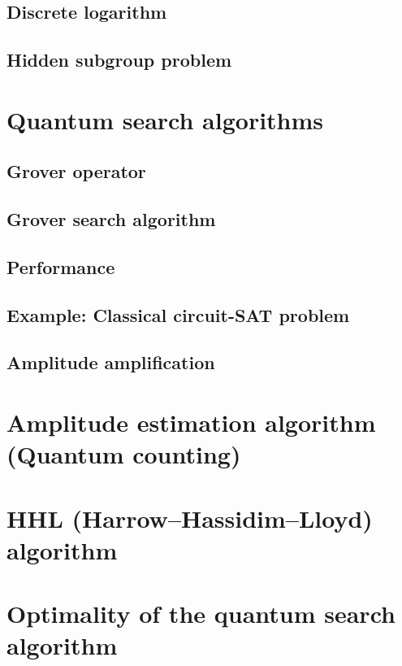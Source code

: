 \subsection{Discrete logarithm}
\subsection{Hidden subgroup problem}




\section{Quantum search algorithms}
\subsection{Grover operator}
\subsection{Grover search algorithm}
\subsection{Performance}

\subsection{Example: Classical circuit-SAT problem}
\subsection{Amplitude amplification}

\section{Amplitude estimation algorithm (Quantum counting)}

\section{HHL (Harrow–Hassidim–Lloyd) algorithm}

\section{Optimality of the quantum search algorithm}